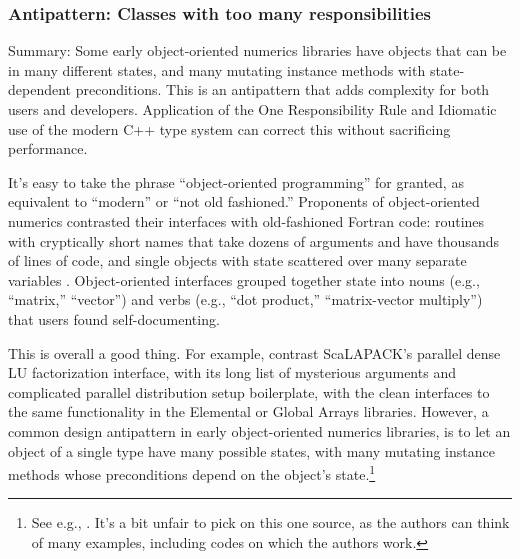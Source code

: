\subsubsection{Antipattern: Classes with too many responsibilities}

Summary: Some early object-oriented numerics libraries have objects
that can be in many different states, and many mutating instance
methods with state-dependent preconditions.  This is an antipattern
that adds complexity for both users and developers.  Application of
the One Responsibility Rule and Idiomatic use of the modern C++ type
system can correct this without sacrificing performance.

It's easy to take the phrase ``object-oriented programming'' for
granted, as equivalent to ``modern'' or ``not old fashioned.''
Proponents of object-oriented numerics contrasted their interfaces
with old-fashioned Fortran code: routines with cryptically short names
that take dozens of arguments and have thousands of lines of code, and
single objects with state scattered over many separate
variables \cite{arge1996oon}.  Object-oriented interfaces
grouped together state into nouns (e.g., ``matrix,'' ``vector'') and
verbs (e.g., ``dot product,'' ``matrix-vector multiply'') that users
found self-documenting.

This is overall a good thing.  For example, contrast ScaLAPACK's
parallel dense LU factorization interface, with its long list of
mysterious arguments and complicated parallel distribution setup
boilerplate, with the clean interfaces to the same functionality in
the Elemental \cite{poulson2013elemental} or Global Arrays
\cite{GlobalArrays} libraries.  However, a common design antipattern
in early object-oriented numerics libraries, is to let an object of a
single type have many possible states, with many mutating instance
methods whose preconditions depend on the object's state.\footnote{See
  e.g., \cite[p. 6]{arge1996oon}.  It's a bit unfair to pick on this
  one source, as the authors can think of many examples, including
  codes on which the authors work.}

